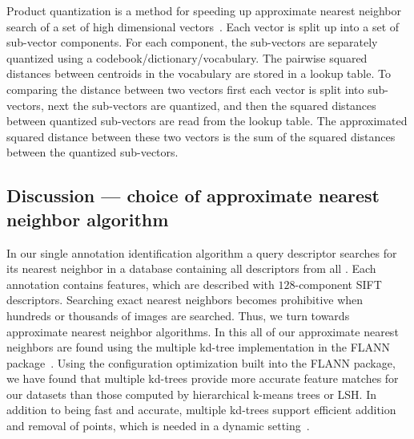             Product quantization is a method for speeding up
              approximate nearest neighbor search of a set of high
              dimensional
              vectors~\cite{jegou_product_2011,ge_optimized_2013}.
            Each vector is split up into a set of sub-vector
              components.
            For each component, the sub-vectors are separately
              quantized using a codebook/dictionary/vocabulary.
            The pairwise squared distances between centroids in the
              vocabulary are stored in a lookup table.
            To comparing the distance between two vectors first each
              vector is split into sub-vectors, next the sub-vectors are
              quantized, and then the squared distances between quantized
              sub-vectors are read from the lookup table.
            The approximated squared distance between these two vectors
              is the sum of the squared distances between the quantized
              sub-vectors.

        \subsection{Discussion --- choice of approximate nearest neighbor algorithm}

            In our single annotation identification algorithm a query
              descriptor searches for its nearest neighbor in a database
              containing all descriptors from all \exemplars{}.
            Each annotation contains  features, which
              are described with $128$-component SIFT descriptors.
            Searching exact nearest neighbors becomes prohibitive when
              hundreds or thousands of images are searched.
            Thus, we turn towards approximate nearest neighbor
              algorithms.
            In this \thesis{} all of our approximate nearest neighbors
              are found using the multiple kd-tree implementation in the
              FLANN package~\cite{muja_fast_2009}.
            Using the configuration optimization built into the FLANN
              package, we have found that multiple kd-trees provide more
              accurate feature matches for our datasets than those
              computed by hierarchical k-means trees or LSH{}.
            In addition to being fast and accurate, multiple kd-trees
              support efficient addition and removal of points, which is
              needed in a dynamic
              setting~\cite{silpa_anan_optimised_2008}.






